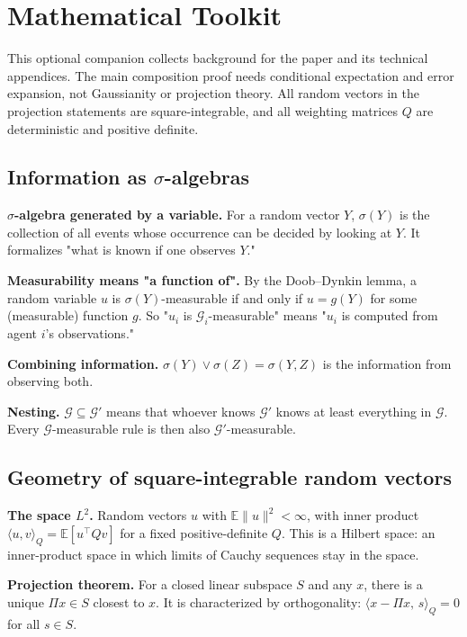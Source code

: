 \section{Mathematical Toolkit}
\label{app:toolkit}
This optional companion collects background for the paper and its technical appendices.
The main composition proof needs conditional expectation and error expansion, not Gaussianity or projection theory.
All random vectors in the projection statements are square-integrable, and
all weighting matrices $Q$ are deterministic and positive definite.

\subsection{Information as \texorpdfstring{$\sigma$}{sigma}-algebras}
\label{app:toolkit-1}
\textbf{$\sigma$-algebra generated by a variable.} For a random vector $Y$, $\sigma(Y)$ is the collection of all events whose occurrence can be decided by looking at $Y$. It formalizes "what is known if one observes $Y$."

\textbf{Measurability means "a function of".} By the Doob--Dynkin lemma, a random variable $u$ is $\sigma(Y)$-measurable if and only if $u=g(Y)$ for some (measurable) function $g$. So "$u_i$ is $\mathcal G_i$-measurable" means "$u_i$ is computed from agent $i$'s observations."

\textbf{Combining information.} $\sigma(Y)\vee\sigma(Z)=\sigma(Y,Z)$ is the information from observing both.

\textbf{Nesting.} $\mathcal G\subseteq\mathcal G'$ means that whoever knows $\mathcal G'$ knows at least everything in $\mathcal G$. Every $\mathcal G$-measurable rule is then also $\mathcal G'$-measurable.

\subsection{Geometry of square-integrable random vectors}
\label{app:toolkit-2}
\textbf{The space $L^2$.} Random vectors $u$ with $\mathbb E\|u\|^2<\infty$, with inner product $\langle u,v\rangle_Q=\mathbb E[u^\top Qv]$ for a fixed positive-definite $Q$. This is a Hilbert space: an inner-product space in which limits of Cauchy sequences stay in the space.

\textbf{Projection theorem.} For a closed linear subspace $S$ and any $x$, there is a unique $\Pi x\in S$ closest to $x$. It is characterized by orthogonality: $\langle x-\Pi x,\,s\rangle_Q=0$ for all $s\in S$.

